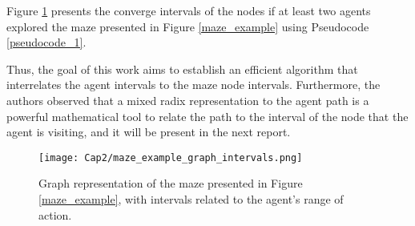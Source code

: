 Figure \ref{maze_example_graph_intervals} presents the converge intervals of the nodes if at least two agents explored the maze presented in Figure \ref{maze_example} using Pseudocode \ref{pseudocode_1}.

Thus, the goal of this work aims to establish an efficient algorithm that interrelates the agent intervals to the maze node intervals. Furthermore, the authors observed that a mixed radix representation to the agent path is a powerful mathematical tool to relate the path to the interval of the node that the agent is visiting, and it will be present in the next report.

\begin{figure}[ht!]
\centering
\texttt{[image: Cap2/maze\_example\_graph\_intervals.png]}
\caption{Graph representation of the maze presented in Figure \ref{maze_example}, with intervals related to the agent's range of action.}
\label{maze_example_graph_intervals}
\end{figure}	